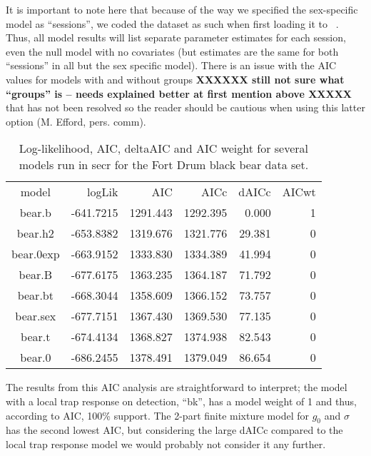 It is important to note here that because of the way we specified the
sex-specific model as ``sessions'', we coded the dataset as such when
first loading it to \secr~.  Thus, all model results will list
separate parameter estimates for each session, even the null model
with no covariates (but estimates are the same for both ``sessions''
in all but the sex specific model). 
There is an issue with the AIC values for models with and without
groups {\bf XXXXXX still not sure what ``groups'' is -- needs
  explained better at first mention above XXXXX} that has not been
resolved so the reader should be cautious when using this latter
option (M. Efford, pers. comm).


\begin{table}[ht]
\centering
\caption{Log-likelihood, AIC, deltaAIC and AIC weight for several models run in secr for the Fort Drum black bear data set.}
\begin{tabular}{crrrrr}
\hline
model     &  logLik   &   AIC    &   AICc   & dAICc  & AICwt \\
bear.b    & -641.7215 & 1291.443 & 1292.395 & 0.000  &  1 \\
bear.h2   & -653.8382 & 1319.676 & 1321.776 & 29.381 &  0 \\
bear.0exp & -663.9152 & 1333.830 & 1334.389 & 41.994 &  0 \\
bear.B    & -677.6175 & 1363.235 & 1364.187 & 71.792 &  0 \\
bear.bt   & -668.3044 & 1358.609 & 1366.152 & 73.757 &  0 \\
bear.sex  & -677.7151 & 1367.430 & 1369.530 & 77.135 &  0 \\
bear.t    & -674.4134 & 1368.827 & 1374.938 & 82.543 &  0 \\
bear.0    & -686.2455 & 1378.491 & 1379.049 & 86.654 &  0 \\
\end{tabular}
\label{covariates.tab.secrAIC}
\end{table}


The results from this AIC analysis are straightforward to interpret; the model
with a local trap response on detection, ``bk'', has a model weight of 1 and thus, according to AIC, 100\% support.
The 2-part finite mixture model for $g_0$ and $\sigma$ has the second lowest
AIC, but considering the large dAICc compared to the local trap response model we would probably not consider it any further.  


